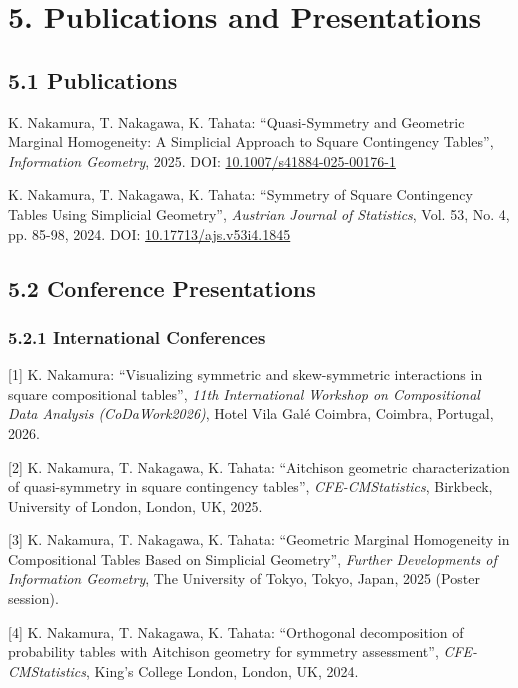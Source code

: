 \documentclass[11pt,a4paper]{article}
\begin{document}
\section*{5. Publications and Presentations}

\subsection*{5.1 Publications}

K. Nakamura, T. Nakagawa, K. Tahata: ``Quasi-Symmetry and Geometric Marginal Homogeneity: A Simplicial Approach to Square Contingency Tables'', \textit{Information Geometry}, 2025. DOI: \href{https://doi.org/10.1007/s41884-025-00176-1}{10.1007/s41884-025-00176-1}

\vspace{0.3em}
K. Nakamura, T. Nakagawa, K. Tahata: ``Symmetry of Square Contingency Tables Using Simplicial Geometry'', \textit{Austrian Journal of Statistics}, Vol. 53, No. 4, pp. 85-98, 2024. DOI: \href{https://doi.org/10.17713/ajs.v53i4.1845}{10.17713/ajs.v53i4.1845}

\subsection*{5.2 Conference Presentations}

\subsubsection*{5.2.1 International Conferences}

[1] K. Nakamura: ``Visualizing symmetric and skew-symmetric interactions in square compositional tables'', \textit{11th International Workshop on Compositional Data Analysis (CoDaWork2026)}, Hotel Vila Galé Coimbra, Coimbra, Portugal, 2026.

\vspace{0.3em}
[2] K. Nakamura, T. Nakagawa, K. Tahata: ``Aitchison geometric characterization of quasi-symmetry in square contingency tables'', \textit{CFE-CMStatistics}, Birkbeck, University of London, London, UK, 2025.

\vspace{0.3em}
[3] K. Nakamura, T. Nakagawa, K. Tahata: ``Geometric Marginal Homogeneity in Compositional Tables Based on Simplicial Geometry'', \textit{Further Developments of Information Geometry}, The University of Tokyo, Tokyo, Japan, 2025 (Poster session).

\vspace{0.3em}
[4] K. Nakamura, T. Nakagawa, K. Tahata: ``Orthogonal decomposition of probability tables with Aitchison geometry for symmetry assessment'', \textit{CFE-CMStatistics}, King's College London, London, UK, 2024.
\end{document}
